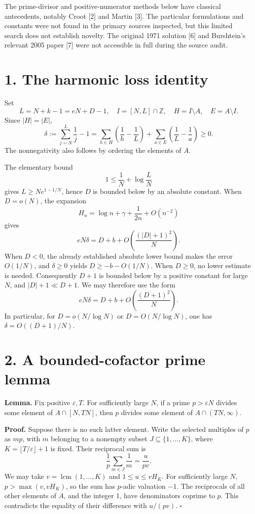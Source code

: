 \documentclass[11pt]{article}
\begin{document}
The prime-divisor and positive-numerator methods below have classical antecedents, notably Croot [2] and Martin [3]. The particular formulations and constants were not found in the primary sources inspected, but this limited search does not establish novelty. The original 1971 solution [6] and Burshtein's relevant 2005 paper [7] were not accessible in full during the source audit.

\section*{1. The harmonic loss identity}

Set
\[
L=N+k-1=eN+D-1,\quad I=[N,L]\cap\mathbb Z,
\quad H=I\setminus A,\quad E=A\setminus I.
\]
Since \(|H|=|E|\),
\[
\delta:=\sum_{j=N}^{L}\frac1j-1
=\sum_{h\in H}\left(\frac1h-\frac1L\right)
 +\sum_{a\in E}\left(\frac1L-\frac1a\right)\ge0. \tag{8}
\]
The nonnegativity also follows by ordering the elements of \(A\).

The elementary bound
\[
1\le\frac1N+\log\frac LN
\]
gives \(L\ge Ne^{1-1/N}\), hence \(D\) is bounded below by an absolute constant. When \(D=o(N)\), the expansion
\[
H_n=\log n+\gamma+\frac1{2n}+O(n^{-2})
\]
gives
\[
eN\delta=D+b+O\!\left(\frac{(|D|+1)^2}{N}\right).
\]
When \(D<0\), the already established absolute lower bound makes the error \(O(1/N)\), and \(\delta\ge0\) yields \(D\ge-b-O(1/N)\). When \(D\ge0\), no lower estimate is needed. Consequently \(D+1\) is bounded below by a positive constant for large \(N\), and \(|D|+1\ll D+1\). We may therefore use the form
\[
eN\delta=D+b+O\!\left(\frac{(D+1)^2}{N}\right). \tag{9}
\]
In particular, for \(D=o(N/\log N)\) or \(D=O(N/\log N)\), one has \(\delta=O((D+1)/N)\).

\section*{2. A bounded-cofactor prime lemma}

\textbf{Lemma.} Fix positive \(\varepsilon,T\). For sufficiently large \(N\), if a prime \(p>\varepsilon N\) divides some element of \(A\cap[N,TN]\), then \(p\) divides some element of \(A\cap(TN,\infty)\).

\textbf{Proof.} Suppose there is no such latter element. Write the selected multiples of \(p\) as \(mp\), with \(m\) belonging to a nonempty subset \(J\subseteq\{1,\ldots,K\}\), where \(K=\lfloor T/\varepsilon\rfloor+1\) is fixed. Their reciprocal sum is
\[
\frac1p\sum_{m\in J}\frac1m=\frac{u}{pv}.
\]
We may take \(v=\operatorname{lcm}(1,\ldots,K)\) and \(1\le u\le vH_K\). For sufficiently large \(N\), \(p>\max(v,vH_K)\), so the sum has \(p\)-adic valuation \(-1\). The reciprocals of all other elements of \(A\), and the integer 1, have denominators coprime to \(p\). This contradicts the equality of their difference with \(u/(pv)\). \(\square\)
\end{document}
